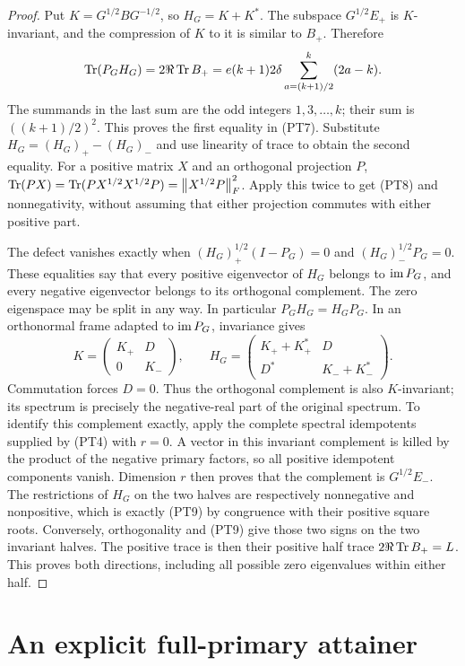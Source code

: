 \begin{proof}
Put \(K=G^{1/2}BG^{-1/2}\), so \(H_G=K+K^*\).
The subspace \(G^{1/2}E_+\) is \(K\)-invariant, and the
compression of \(K\) to it is similar to \(B_+\). Therefore
\[
 \operatorname{Tr}(P_GH_G)=2\Re\operatorname{Tr} B_+
 =e(k+1)2\delta\sum_{a=(k+1)/2}^k(2a-k).
\]
The summands in the last sum are the odd integers
\(1,3,\ldots,k\); their sum is \(((k+1)/2)^2\). This proves
the first equality in (PT7). Substitute
\(H_G=(H_G)_+-(H_G)_-\) and use linearity of trace to obtain
the second equality. For a positive matrix \(X\) and an orthogonal
projection \(P\),
\(\operatorname{Tr}(PX)=\operatorname{Tr}(PX^{1/2}X^{1/2}P)=\left\lVert X^{1/2}P\right\rVert_F^2\).
Apply this twice to get (PT8) and nonnegativity, without assuming
that either projection commutes with either positive part.

The defect vanishes exactly when
\((H_G)_+^{1/2}(I-P_G)=0\) and \((H_G)_-^{1/2}P_G=0\).
These equalities say that every positive eigenvector of \(H_G\)
belongs to \(\operatorname{im} P_G\), and every negative eigenvector belongs
to its orthogonal complement. The zero eigenspace may be split in
any way. In particular \(P_GH_G=H_GP_G\).
In an orthonormal frame adapted to \(\operatorname{im} P_G\), invariance gives
\[
 K=\begin{pmatrix}K_+&D\\0&K_-\end{pmatrix},\qquad
 H_G=\begin{pmatrix}K_++K_+^*&D\\D^*&K_-+K_-^*\end{pmatrix}.
\]
Commutation forces \(D=0\). Thus the orthogonal complement is
also \(K\)-invariant; its spectrum is precisely the negative-real
part of the original spectrum. To identify this complement exactly,
apply the complete spectral idempotents supplied by (PT4) with
\(r=0\). A vector in this invariant complement is killed by the
product of the negative primary factors, so all positive idempotent
components vanish. Dimension \(r\) then proves that the complement
is \(G^{1/2}E_-\). The restrictions of \(H_G\) on the two halves
are respectively nonnegative and nonpositive, which is exactly
(PT9) by congruence with their positive square roots.
Conversely, orthogonality and (PT9) give those two signs on the
two invariant halves. The positive trace is then their positive
half trace \(2\Re\operatorname{Tr} B_+=L\). This proves both directions,
including all possible zero eigenvalues within either half.
\end{proof}

\section{An explicit full-primary attainer}

